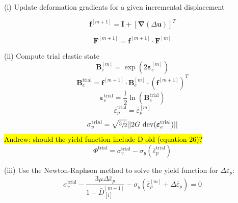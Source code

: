 \documentclass[sn-mathphys,Numbered,draft]{sn-jnl}%
\newcommand{\bb}{\boldsymbol}
\begin{document}
\begin{algorithm}[htbp] \label{alg:lemaitre} \footnotesize
\SetAlgoLined
(i) Update deformation gradients for a given incremental displacement

\begin{equation}
  \mathbf{f}^{[m+1]} = \mathbf{I} + \left[ \bb{\nabla}(\Delta\textbf{u}) \right]^T \nonumber
\end{equation}

\begin{equation}
  \mathbf{F}^{[m+1]} = \mathbf{f}^{[m+1]} \cdot \mathbf{F}^{[m]}  \nonumber
\end{equation}

(ii) Compute trial elastic state
\begin{equation}
\mathbf{B}_{e}^{[m]} = \exp\left({2\boldsymbol{\varepsilon}_{e}^{[m]}}\right) \nonumber
\end{equation}
\begin{equation}
\mathbf{B}_{e}^{\text{trial}} = \mathbf{f}^{[m+1]} \cdot \mathbf{B}_{e}^{[m]} \cdot (\mathbf{f}^{[m+1]})^{T}\nonumber
\end{equation}
\begin{equation}
\boldsymbol{\varepsilon}_{e}^{\text{trial}} = \frac{1}{2} \ln(\textbf{B}_{e}^{\text{trial}}) \nonumber
\end{equation}
\begin{equation}
\bar{\varepsilon}^{\text{trial}}_p = \bar{\varepsilon}^{[m]}_p \nonumber
\end{equation}
\begin{equation}
\sigma_{v}^{\text{trial}} = \sqrt{\sfrac{3}{2}} || 2G\ \text{dev}(\boldsymbol{\varepsilon}_{e}^{\text{trial}})|| \nonumber
\end{equation}
\hl{Andrew: should the yield function include D old (equation 26)?}
\begin{equation}
\Phi^{\text{trial}} =  \sigma_{v}^{\text{trial}} - \sigma_{y}(\bar{\varepsilon}^{\text{trial}}_p) \nonumber 
\end{equation}

(iii) Use the Newton-Raphson method to solve the yield function for $\Delta\bar{\varepsilon}_p$:
\begin{equation}
	\sigma_{v}^{\text{trial}} 
	- \frac{ 3\mu \Delta\bar{\varepsilon}_p }{1 - \bar{D}^{[m+1]}_{[i]}}
	-\sigma_{y}(\bar{\varepsilon}^{[m]}_p + \Delta\bar{\varepsilon}_p) = 0 \nonumber
\end{equation}


\end{algorithm}
\end{document}
